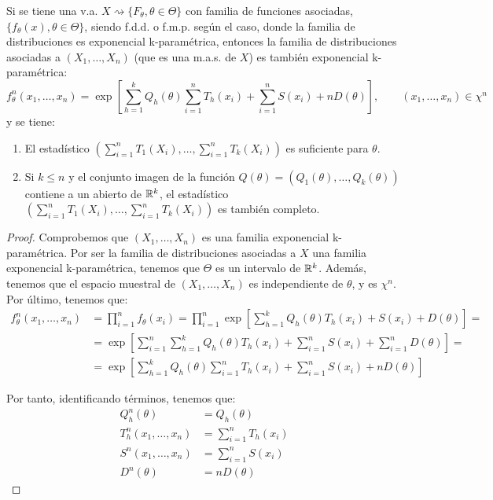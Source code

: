 \begin{teo}
    Si se tiene una v.a. $X \rightsquigarrow \{F_\theta, \theta\in\Theta\}$ con familia de funciones asociadas, $\{f_\theta(x), \theta\in\Theta\}$, siendo f.d.d. o f.m.p. según el caso, donde la familia de distribuciones es exponencial k-paramétrica, entonces la familia de distribuciones asociadas a $(X_1, \ldots, X_n)$ (que es una m.a.s. de $X$) es también exponencial k-paramétrica:
    \begin{equation*}
        f_\theta^n(x_1, \ldots, x_n) = \exp\left[\sum\limits_{h=1}^k Q_h(\theta) \sum\limits_{i=1}^n T_h(x_i) + \sum\limits_{i=1}^n S(x_i) + n D(\theta)\right], \qquad (x_1, \ldots, x_n)\in\chi^n
    \end{equation*}
    y se tiene:
    \begin{enumerate}
        \item El estadístico $\left(\sum\limits_{i=1}^n T_1(X_i), \ldots, \sum\limits_{i=1}^n T_k(X_i)\right)$ es suficiente para $\theta$.
        \item Si $k\leq n$ y el conjunto imagen de la función $Q(\theta) = (Q_1(\theta), \ldots, Q_k(\theta))$ contiene a un abierto de $\mathbb{R}^k$, el estadístico $\left(\sum\limits_{i=1}^n T_1(X_i), \ldots, \sum\limits_{i=1}^n T_k(X_i)\right)$ es también completo.
    \end{enumerate}
    \begin{proof}
        Comprobemos que $(X_1, \ldots, X_n)$ es una familia exponencial k-paramétrica. Por ser la familia de distribuciones asociadas a $X$ una familia exponencial k-paramétrica, tenemos que $\Theta$ es un intervalo de $\mathbb{R}^k$. Además, tenemos que el espacio muestral de $(X_1, \ldots, X_n)$ es independiente de $\theta$, y es $\chi^n$. Por último, tenemos que:
        \begin{align*}
            f_\theta^n(x_1, \ldots, x_n) &= \prod_{i=1}^n f_\theta(x_i) = \prod_{i=1}^n \exp\left[\sum\limits_{h=1}^k Q_h(\theta) T_h(x_i) + S(x_i) + D(\theta)\right]
            =\\&= \exp\left[\sum\limits_{i=1}^n \sum\limits_{h=1}^k Q_h(\theta) T_h(x_i) + \sum\limits_{i=1}^n S(x_i) + \sum\limits_{i=1}^n D(\theta)\right]
            =\\&= \exp\left[\sum\limits_{h=1}^k Q_h(\theta) \sum\limits_{i=1}^n T_h(x_i) + \sum\limits_{i=1}^n S(x_i) + n D(\theta)\right]
        \end{align*}

        Por tanto, identificando términos, tenemos que:
        \begin{align*}
            Q_h^n(\theta) &= Q_h(\theta) \\
            T_h^n(x_1, \ldots, x_n) &= \sum\limits_{i=1}^n T_h(x_i) \\
            S^n(x_1, \ldots, x_n) &= \sum\limits_{i=1}^n S(x_i) \\
            D^n(\theta) &= n D(\theta)
        \end{align*}


\end{proof}
\end{teo}
